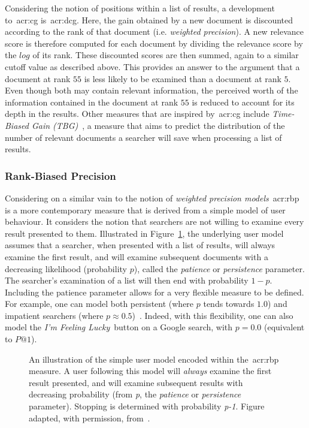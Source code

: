Considering the notion of positions within a list of results, a development to~\gls{acr:cg} is~\gls{acr:dcg}. Here, the gain obtained by a new document is discounted according to the rank of that document (i.e. \emph{weighted precision}). A new relevance score is therefore computed for each document by dividing the relevance score by the $log$ of its rank. These discounted scores are then summed, again to a similar cutoff value as described above. This provides an answer to the argument that a document at rank $55$ is less likely to be examined than a document at rank $5$. Even though both may contain relevant information, the perceived worth of the information contained in the document at rank $55$ is reduced to account for its depth in the results. Other measures that are inspired by~\gls{acr:cg} include \emph{Time-Biased Gain (TBG)}~\citep{smucker2012tbg}, a measure that aims to predict the distribution of the number of relevant documents a searcher will save when processing a list of results. 

\subsubsection{Rank-Biased Precision}
Considering on a similar vain to the notion of \emph{weighted precision models}~\gls{acr:rbp}~\citep{moffat2008rbp} is a more contemporary measure that is derived from a simple model of user behaviour. It considers the notion that searchers are not willing to examine every result presented to them. Illustrated in Figure~\ref{fig:rbp}, the underlying user model assumes that a searcher, when presented with a list of results, will always examine the first result, and will examine subsequent documents with a decreasing likelihood (probability $p$), called the \emph{patience} or \emph{persistence} parameter. The searcher's examination of a list will then end with probability $1-p$. Including the patience parameter allows for a very flexible measure to be defined. For example, one can model both persistent (where $p$ tends towards $1.0$) and impatient searchers (where $p\approx0.5$)~\citep{moffat2008rbp}. Indeed, with this flexibility, one can also model the \emph{I'm Feeling Lucky}\texttrademark~button on a Google search, with $p=0.0$ (equivalent to $P@1$).

\begin{figure}[t!]
    \centering
    \caption[Rank-Biased Precision]{An illustration of the simple user model encoded within the~\gls{acr:rbp} measure. A user following this model will \emph{always} examine the first result presented, and will examine subsequent results with decreasing probability (from \emph{p}, the \emph{patience} or \emph{persistence} parameter). Stopping is determined with probability \emph{p-1}. Figure adapted, with permission, from~\cite{moffat2008rbp}.}
    \label{fig:rbp}
\end{figure}


